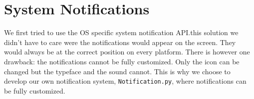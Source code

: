 \section{System Notifications}

We first tried to use the OS specific system notification API.\@With this
solution we didn't have to care were the notifications would appear on the
screen. They would always be at the correct position on every platform. There is
however one drawback: the notifications cannot be fully customized. Only the
icon can be changed but the typeface and the sound cannot. This is why we choose
to develop our own notification system, \texttt{Notification.py}, where
notifications can be fully customized.
